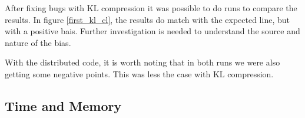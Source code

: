 \documentclass[twocolumn]{article}
\begin{document}
After fixing bugs with KL compression it was possible to do runs to compare the results. In figure \ref{first_kl_cl}, the results do match with the expected line, but with a positive bais. Further investigation is needed to understand the source and nature of the bias.

With the distributed code, it is worth noting that in both runs we were also getting some negative points. This was less the case with KL compression.

\subsection{Time and Memory}
\end{document}
